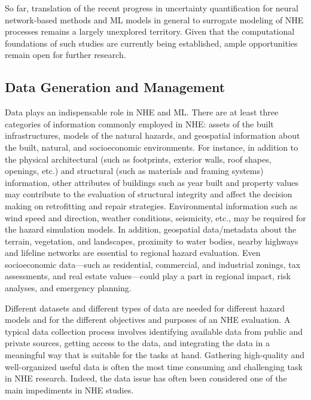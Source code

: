 So far, translation of the recent progress in uncertainty quantification for neural network-based methods and ML models in general to surrogate modeling of NHE processes remains a largely unexplored territory. Given that the computational foundations of such studies are currently being established, ample opportunities remain open for further research.

\subsection{Data Generation and Management}

Data plays an indispensable role in NHE and ML. There are at least three categories of information commonly employed in NHE: assets of the built infrastructures, models of the natural hazards, and geospatial information about the built, natural, and socioeconomic environments. For instance, in addition to the physical architectural (such as footprints, exterior walls, roof shapes, openings, etc.) and structural (such as materials and framing systems) information, other attributes of buildings such as year built and property values may contribute to the evaluation of structural integrity and affect the decision making on retrofitting and repair strategies. Environmental information such as wind speed and direction, weather conditions, seismicity, etc., may be required for the hazard simulation models.
In addition, geospatial data/metadata about the terrain, vegetation, and landscapes, proximity to water bodies, nearby highways and lifeline networks are essential to regional hazard evaluation. Even socioeconomic data---such as residential, commercial, and industrial zonings, tax assessments, and real estate values---could play a part in regional impact, risk analyses, and emergency planning.

Different datasets and different types of data are needed for different hazard models and for the different objectives and purposes of an NHE evaluation. A typical data collection process involves identifying available data from public and private sources, getting access to the data, and integrating the data in a meaningful way that is suitable for the tasks at hand. Gathering high-quality and well-organized useful data is often the most time consuming and challenging task in NHE research. Indeed, the data issue has often been considered one of the main impediments in NHE studies. 

